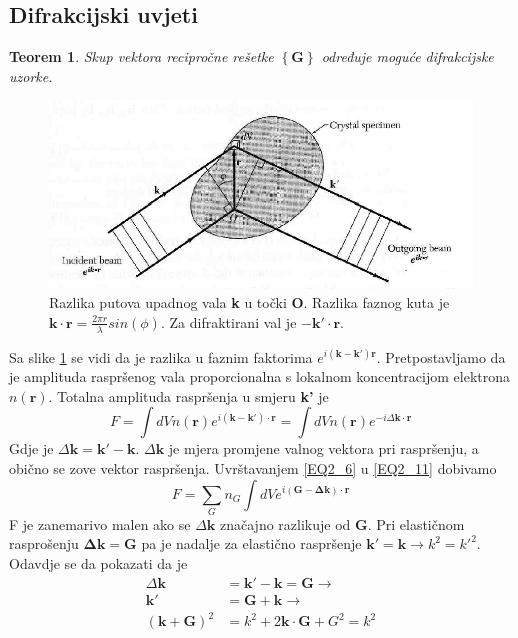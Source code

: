 \documentclass{article}
\newtheorem{theorem}{Teorem}
\numberwithin{equation}{section}
\begin{document}
   \subsection{Difrakcijski uvjeti}
\begin{theorem}
   Skup vektora recipročne rešetke $\left\{ \mathbf{G}\right\}$ određuje moguće difrakcijske uzorke. 
\end{theorem}
   \begin{figure}[h!]
       \centering
       \includegraphics[width=15cm]{UvjetDiff.PNG}
       \caption{Razlika putova upadnog vala \textbf{k} u točki \textbf{O}. Razlika faznog kuta je $\mathbf{k\cdot r}= \frac{2\pi r }{\lambda}sin(\phi)$. Za difraktirani val je $-\mathbf{k'\cdot r}$. }
       \label{diffuvj}
   \end{figure}
   Sa slike \ref{diffuvj} se vidi da je razlika u faznim faktorima $e^{i\left( \mathbf{k-k'}\right)\mathbf{r}}$. Pretpostavljamo da je amplituda raspršenog vala proporcionalna s lokalnom koncentracijom elektrona $n(\mathbf{r})$. Totalna amplituda raspršenja u smjeru \textbf{k'} je 
   \begin{equation}
       F=\int dV n(\mathbf{r})e^{i\left( \mathbf{k-k'}\right)\cdot\mathbf{r}}
        =\int dV n(\mathbf{r})e^{-i \Delta\mathbf{k} \cdot \mathbf{r}}
        \label{EQ2_11}
   \end{equation}
   Gdje je $\Delta \mathbf{k}= \mathbf{k'-k}$. $\Delta \mathbf{k}$ je mjera promjene valnog vektora pri raspršenju, a obično se zove vektor raspršenja. Uvrštavanjem \ref{EQ2_6} u \ref{EQ2_11} dobivamo 
   \begin{equation}
       F= \sum_G n_G \int dV e^{i\left(\mathbf{G-\Delta k} \right)\cdot \mathbf{r}}
       \label{EQ2_12}
   \end{equation}
   F je zanemarivo malen ako se $\Delta \mathbf{k}$ značajno razlikuje od \textbf{G}. Pri elastičnom rasprošenju $\mathbf{\Delta k}=\mathbf{G}$ pa je nadalje za elastično raspršenje $\mathbf{k'=k} \rightarrow k^2={k'}^2$. Odavdje se da pokazati da je \begin{equation}
   \begin{split}
       \Delta \mathbf{k}&= \mathbf{k'-k}=\mathbf{G} \rightarrow \\
       \mathbf{k'}&=\mathbf{G+k} \rightarrow \\
       (\mathbf{k+G})^2&=k^2+2\mathbf{k\cdot G}+G^2=k^2
   \end{split}
   \label{EQ2_13}
   \end{equation}
\end{document}
